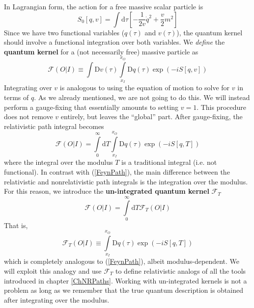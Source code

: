 In Lagrangian form, the action for a free massive scalar particle is
\begin{equation}
	S_{0}[q, v] = \int \mathrm{d}\tau \left[- \frac{1}{2v} \dot{q}^{2} + \frac{v}{2} m^{2} \right]
\end{equation}
Since we have two functional variables ($q(\tau)$ and $v(\tau)$), the quantum kernel should involve a functional integration over both variables. We \textit{define} the \textbf{quantum kernel} for a (not necessarily free) massive particle as
\begin{equation}
	\mathcal{F}(O|I) \equiv \int \mathrm{D}v(\tau) \int\limits_{x_{I}}^{x_{O}} \mathrm{D}q(\tau) \exp{\left( -i S[q, v] \right)}
\end{equation}
Integrating over $v$ is analogous to using the equation of motion to solve for $v$ in terms of $q$. As we already mentioned, we are not going to do this. We will instead perform a gauge-fixing that essentially amounts to setting $v = 1$. This procedure does not remove $v$ entirely, but leaves the ``global'' part. After gauge-fixing, the relativistic path integral becomes
\begin{equation}
	\mathcal{F}(O|I) = \int\limits_{0}^{\infty} \mathrm{d}T \int\limits_{x_{I}}^{x_{O}} \mathrm{D}q(\tau) \exp{\left( -i S[q, T] \right)}
\end{equation}
where the integral over the modulus $T$ is a traditional integral (i.e. not functional). In contrast with (\ref{FeynPath}), the main difference between the relativistic and nonrelativistic path integrals is the integration over the modulus. For this reason, we introduce the \textbf{un-integrated quantum kernel} $\mathcal{F}_{T}$
\begin{equation}
	\mathcal{F}(O|I) = \int\limits_{0}^{\infty} \mathrm{d}T \mathcal{F}_{T}(O|I)
\end{equation}
That is,
\begin{equation}
	\mathcal{F}_{T}(O|I) \equiv \int\limits_{x_{I}}^{x_{O}} \mathrm{D}q(\tau) \exp{\left( -i S[q, T] \right)}
\end{equation}
which is completely analogous to (\ref{FeynPath}), albeit modulus-dependent. We will exploit this analogy and use $\mathcal{F}_{T}$ to define relativistic analogs of all the tools introduced in chapter \ref{ChNRPaths}. Working with un-integrated kernels is not a problem as long as we remember that the true quantum description is obtained after integrating over the modulus.
